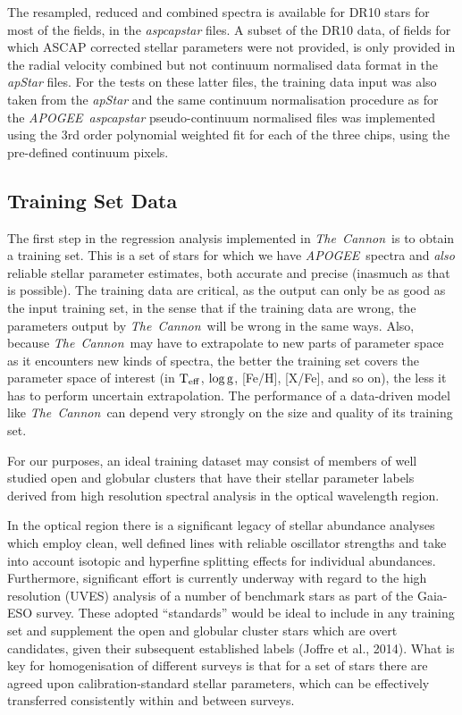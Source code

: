 \documentclass[12pt, preprint]{aastex}
\newcommand{\teff}{\mbox{$\rm T_{eff}$}}
\newcommand{\logg}{\mbox{$\rm \log g$}}
\newcommand{\tc}{\textsl{The~Cannon}}
\newcommand{\apogee}{\textsl{APOGEE}}
\begin{document}
The resampled, reduced and combined spectra is available for DR10 stars for most of the fields, in the \textit{aspcapstar} files. A subset of the DR10 data, of fields for which ASCAP corrected stellar parameters were not provided, is only provided in the radial velocity combined but not continuum normalised data format in the \textit{apStar} files. For the tests on these latter files, the training data input was also taken from the \textit{apStar} and the same continuum normalisation procedure as for the \apogee\ \textit{aspcapstar} pseudo-continuum normalised files was implemented using the 3rd order polynomial weighted fit for each of the three chips, using the pre-defined continuum pixels.


\subsection{Training Set Data}

The first step in the regression analysis implemented in \tc\ is to
obtain a training set. This is a set of stars for which we have \apogee\ spectra and
\emph{also} reliable stellar parameter estimates, both accurate and
precise (inasmuch as that is possible).
The training data are critical, as the output can only be as good as
the input training set, in the sense that if the training data are
wrong, the parameters output by \tc\ will be wrong in the same ways.
Also, because \tc\ may have to extrapolate to new parts of parameter
space as it encounters new kinds of spectra, the better the training
set covers the parameter space of interest (in \teff, \logg, [Fe/H],
[X/Fe], and so on), the less it has to perform uncertain
extrapolation.
The performance of a data-driven model like \tc\ can depend very
strongly on the size and quality of its training set.

For our purposes, an ideal training dataset may consist of members of
well studied open and globular clusters that have their stellar
parameter labels derived from high resolution spectral analysis in the
optical wavelength region.

In the optical region there is a significant legacy of stellar abundance analyses which employ clean, well defined lines with reliable oscillator strengths and take into account isotopic and hyperfine splitting effects for individual abundances. Furthermore, significant effort is currently underway with regard to the high resolution (UVES) analysis of a number of benchmark stars as part of the Gaia-ESO survey. These adopted ``standards'' would be ideal to include in any training set and supplement the open and globular cluster stars which are overt candidates, given their subsequent established labels (Joffre et al., 2014). What is key for homogenisation of different surveys is that for a set of stars there are agreed upon calibration-standard stellar parameters, which can be effectively transferred consistently within and between surveys.  
\end{document}
